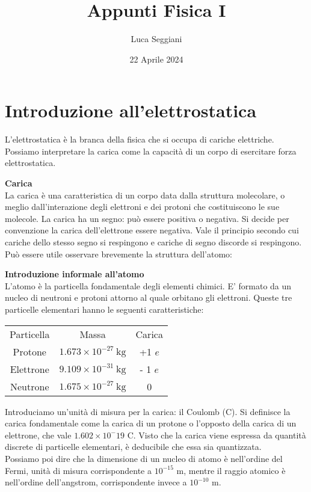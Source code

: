 \documentclass[a4paper,12pt]{article}
\title{Appunti Fisica I}
\author{Luca Seggiani}
\date{22 Aprile 2024}
\begin{document}
\maketitle
\section{Introduzione all'elettrostatica}
L'elettrostatica è la branca della fisica che si occupa di cariche elettriche. Possiamo interpretare la carica
come la capacità di un corpo di esercitare forza elettrostatica.
\par\smallskip
\textbf{Carica} \\
La carica è una caratteristica di un corpo data dalla struttura molecolare, o meglio dall'interazione degli elettroni 
e dei protoni che costituiscono le sue molecole. La carica ha un segno: può essere positiva o negativa. Si decide per convenzione
la carica dell'elettrone essere negativa. Vale il principio secondo cui cariche dello stesso segno si respingono e cariche di segno
discorde si respingono. Può essere utile osservare brevemente la struttura dell'atomo:
\par\smallskip
\textbf{Introduzione informale all'atomo} \\
L'atomo è la particella fondamentale degli elementi chimici. E' formato da un nucleo di neutroni e protoni attorno al quale
orbitano gli elettroni. Queste tre particelle elementari hanno le seguenti caratteristiche:
\begin{center}
\begin{tabular}{|c|c|c|}
  Particella & Massa & Carica \\
  Protone & $1.673 \times 10^{-27} \  \mathrm{kg}$ & +1 $e$ \\
  Elettrone & $9.109 \times 10^{-31} \  \mathrm{kg}$ & - 1 $e$ \\
  Neutrone & $1.675 \times 10^{-27} \  \mathrm{kg}$ & 0 \\
\end{tabular}
\end{center}
Introduciamo un'unità di misura per la carica: il Coulomb (C). Si definisce la carica fondamentale come la carica di un protone o l'opposto della carica di un elettrone,
che vale $1.602 \times 10^-19$ C. Visto che la carica viene espressa da quantità
discrete di particelle elementari, è deducibile che essa sia quantizzata. \\
Possiamo poi dire che la dimensione di un nucleo di atomo è nell'ordine del Fermi, unità di misura corrispondente a $10^{-15}$ m,
mentre il raggio atomico è nell'ordine dell'angstrom, corrispondente invece a $10^{-10}$ m.
\end{document}
